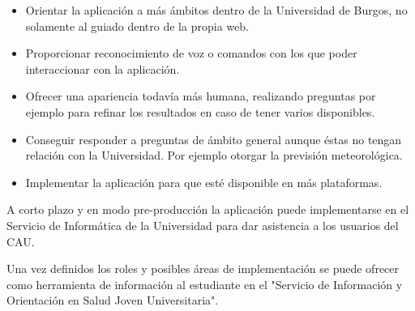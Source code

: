 \begin{itemize}
\tightlist
\item
Orientar la aplicación a más ámbitos dentro de la Universidad de Burgos, no solamente al guiado dentro de la propia web.
\item
Proporcionar reconocimiento de voz o comandos con los que poder interaccionar con la aplicación.
\item
Ofrecer una apariencia todavía más humana, realizando preguntas por ejemplo para refinar los resultados en caso de tener varios disponibles.
\item
Conseguir responder a preguntas de ámbito general aunque éstas no tengan relación con la Universidad. Por ejemplo otorgar la previsión meteorológica.
\item
Implementar la aplicación para que esté disponible en más plataformas.
\end{itemize}

A corto plazo y en modo pre-producción la aplicación puede implementarse en el Servicio de Informática de la Universidad para dar asistencia a los usuarios del CAU.

Una vez definidos los roles y posibles áreas de implementación se puede ofrecer como herramienta de información al estudiante en el
"Servicio de Información y Orientación en Salud Joven Universitaria".
